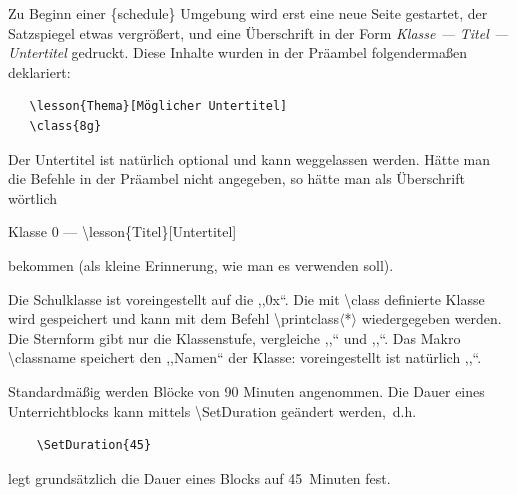 \documentclass[hyperworksheet,pgfplots]{drcschool}
\newcommand*{\cs}[1]{\textup{\ttfamily\textbackslash#1}}                   %
\newcommand*{\env}[1]{\textup{\ttfamily\{#1\}}}                            %
\newcommand*{\optstar}{\mbox{\ttfamily$\langle$*$\rangle$}}                %
\begin{document}

Zu Beginn einer \env{schedule} Umgebung wird erst eine neue Seite gestartet, der Satzspiegel
etwas vergrößert, und eine Überschrift in der Form \emph{Klasse --- Titel --- Untertitel}
gedruckt. Diese Inhalte wurden in der Präambel folgendermaßen deklariert:
\begin{verbatim}
   \lesson{Thema}[Möglicher Untertitel]
   \class{8g}
\end{verbatim}
Der Untertitel ist natürlich optional und kann weggelassen werden. Hätte man die Befehle
in der Präambel nicht angegeben, so hätte man als Überschrift wörtlich
\begin{center}
Klasse 0 --- \cs{lesson\{Titel\}[Untertitel]}
\end{center}
bekommen (als kleine Erinnerung, wie man es verwenden soll).

Die Schulklasse ist voreingestellt auf die ,,0x``.
Die mit \cs{class} definierte Klasse wird gespeichert und kann mit dem Befehl \cs{printclass\optstar}
wiedergegeben werden. Die Sternform gibt nur die Klassenstufe, vergleiche
,,\printclass`` und ,,\printclass*``. Das Makro \cs{classname} speichert den ,,Namen`` der Klasse:
voreingestellt ist natürlich ,,\classname``.

Standardmäßig werden Blöcke von 90 Minuten angenommen. Die Dauer eines Unterrichtblocks
kann mittels \cs{SetDuration} geändert werden,~d.h.
\begin{verbatim}
    \SetDuration{45}
\end{verbatim}
legt grundsätzlich die Dauer eines Blocks auf 45~Minuten fest.
\end{document}

